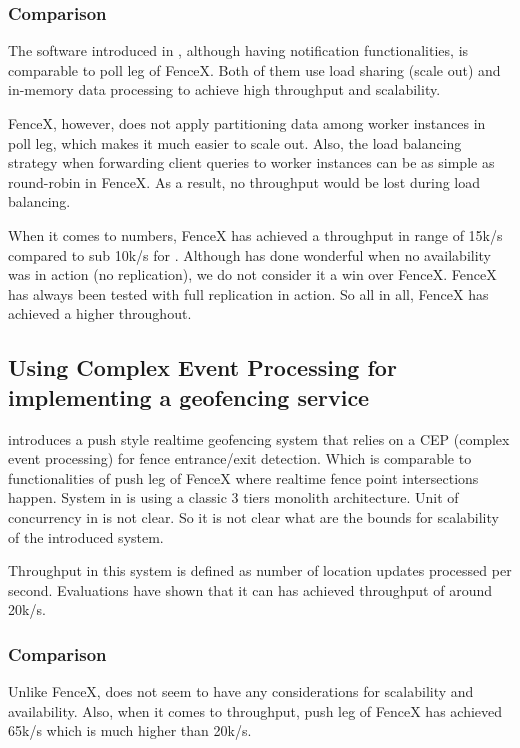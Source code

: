 \documentclass[a4]{report}
\begin{document}
        \subsubsection{Comparison}
        The software introduced in \cite{Cirillo-Jacobs-Martin-Szczytowski-2014}, although having notification
        functionalities, is comparable to poll leg of FenceX.
        Both of them use load sharing (scale out) and in-memory data processing to achieve high throughput and
        scalability.

        FenceX, however, does not apply partitioning data among worker instances in poll leg, which makes it much easier to
        scale out.
        Also, the load balancing strategy when forwarding client queries to worker instances can be as simple as
        round-robin in FenceX.
        As a result, no throughput would be lost during load balancing.

        When it comes to numbers, FenceX has achieved a throughput in range of 15k/s compared to sub 10k/s for
        \cite{Cirillo-Jacobs-Martin-Szczytowski-2014}.
        Although \cite{Cirillo-Jacobs-Martin-Szczytowski-2014} has done wonderful when no availability was in action
        (no replication), we do not consider it a win over FenceX.
        FenceX has always been tested with full replication in action.
        So all in all, FenceX has achieved a higher throughout.

        \subsection{Using Complex Event Processing for implementing a geofencing service \cite{Nechifor_Comnac_2013}}
        \cite{Nechifor_Comnac_2013} introduces a push style realtime geofencing system that relies on a CEP
        (complex event processing) for fence entrance/exit detection.
        Which is comparable to functionalities of push leg of FenceX where realtime fence point intersections happen.
        System in \cite{Nechifor_Comnac_2013} is using a classic 3 tiers monolith architecture.
        Unit of concurrency in \cite{Nechifor_Comnac_2013} is not clear.
        So it is not clear what are the bounds for scalability of the introduced system.

        Throughput in this system is defined as number of location updates processed per second.
        Evaluations have shown that it can has achieved throughput of around 20k/s.

        \subsubsection{Comparison}
        Unlike FenceX, \cite{Nechifor_Comnac_2013} does not seem to have any considerations for
        scalability and availability.
        Also, when it comes to throughput, push leg of FenceX has achieved 65k/s which is much higher than 20k/s.
\end{document}
